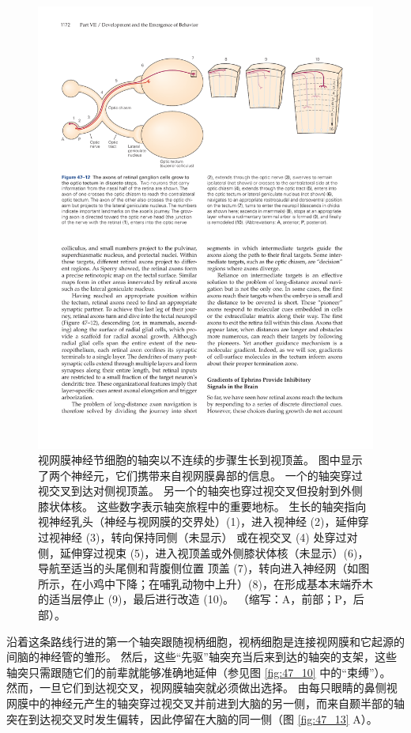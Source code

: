 \begin{figure}[htbp]
	\centering
	\includegraphics[width=0.95\linewidth]{chap47/fig_47_12}
	\caption{视网膜神经节细胞的轴突以不连续的步骤生长到视顶盖。 图中显示了两个神经元，它们携带来自视网膜鼻部的信息。 一个的轴突穿过视交叉到达对侧视顶盖。 另一个的轴突也穿过视交叉但投射到外侧膝状体核。 这些数字表示轴突旅程中的重要地标。 生长的轴突指向视神经乳头（神经与视网膜的交界处）(1)，进入视神经 (2)，延伸穿过视神经 (3)，转向保持同侧（未显示） 或在视交叉 (4) 处穿过对侧，延伸穿过视束 (5)，进入视顶盖或外侧膝状体核（未显示）(6)，导航至适当的头尾侧和背腹侧位置 顶盖 (7)，转向进入神经网（如图所示，在小鸡中下降；在哺乳动物中上升）(8)，在形成基本末端乔木的适当层停止 (9)，最后进行改造 (10)。 （缩写：A，前部；P，后部）。}
	\label{fig:47_12}
\end{figure}

沿着这条路线行进的第一个轴突跟随视柄细胞，视柄细胞是连接视网膜和它起源的间脑的神经管的雏形。 
然后，这些“先驱”轴突充当后来到达的轴突的支架，这些轴突只需跟随它们的前辈就能够准确地延伸（参见图 \ref{fig:47_10} 中的“束缚”）。 
然而，一旦它们到达视交叉，视网膜轴突就必须做出选择。 
由每只眼睛的鼻侧视网膜中的神经元产生的轴突穿过视交叉并前进到大脑的另一侧，而来自颞半部的轴突在到达视交叉时发生偏转，因此停留在大脑的同一侧（图 \ref{fig:47_13} A）。

